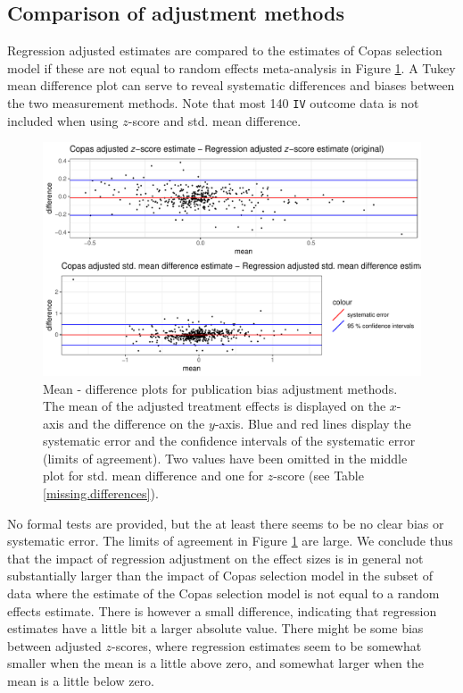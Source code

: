 \documentclass[11pt,a4paper,twoside]{book}\usepackage[]{graphicx}\usepackage[]{color}
\newenvironment{knitrout}{}{} %
\begin{document}
\subsection{Comparison of adjustment methods}
Regression adjusted estimates are compared to the estimates of Copas selection model if these are not equal to random effects meta-analysis in Figure \ref{fig:adjustment.mean.diff}. A Tukey mean difference plot can serve to reveal systematic differences and biases between the two measurement methods. Note that most 140 \texttt{IV} outcome data is not included when using $z$-score and std. mean difference.

\begin{figure}
\begin{knitrout}
\color{fgcolor}

{\centering \includegraphics[width=\textwidth-3cm]{figure/ch03_figunnamed-chunk-24-1} 

}



\end{knitrout}
\caption{Mean - difference plots for publication bias adjustment methods. The mean of the adjusted treatment effects is displayed on the $x$-axis and the difference on the $y$-axis. Blue and red lines display the systematic error and the confidence intervals of the systematic error (limits of agreement). Two values have been omitted in the middle plot for std. mean difference and one for $z$-score (see Table \ref{missing.differences}).}
\label{fig:adjustment.mean.diff}
\end{figure}

No formal tests are provided, but the at least there seems to be no clear bias or systematic error. The limits of agreement in Figure \ref{fig:adjustment.mean.diff} are large. We conclude thus that the impact of regression adjustment on the effect sizes is in general not substantially larger than the impact of Copas selection model in the subset of data where the estimate of the Copas selection model is not equal to a random effects estimate. There is however a small difference, indicating that regression estimates have a little bit a larger absolute value. There might be some bias between adjusted $z$-scores, where regression estimates seem to be somewhat smaller when the mean is a little above zero, and somewhat larger when the mean is a little below zero. \\
\end{document}

